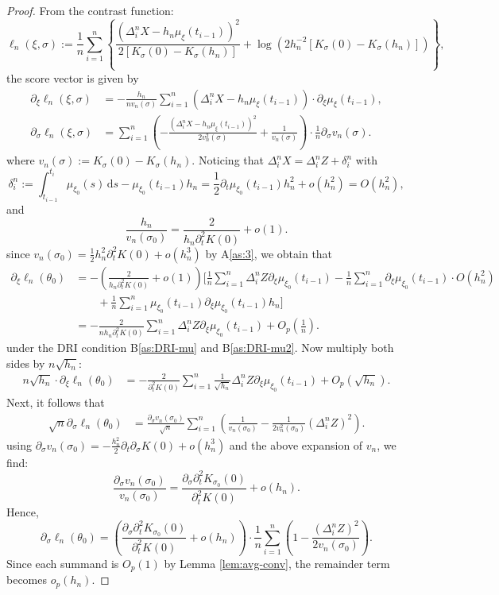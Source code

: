 \documentclass[a4paper,10pt,twoside]{article}
\numberwithin{equation}{section}
\def\D{\Delta}
\def\l{\left}
\def\r{\right}
\def\s{\sigma}
\def\p{\partial}
\begin{document}
\begin{proof}
From the contrast function:
\[
\ell_n(\xi, \sigma) := \frac{1}{n} \sum_{i=1}^n \l\{
\frac{(\Delta_i^n X - h_n \mu_\xi(t_{i-1}))^2}{2 [K_\sigma(0) - K_\sigma(h_n)]} +
\log \l( 2 h_n^{-2} [K_\sigma(0) - K_\sigma(h_n)] \r)
\r\}, 
\]
the score vector is given by
\begin{align*}
\partial_\xi \ell_n(\xi, \sigma)
&= - \frac{h_n}{n v_n(\s) } \sum_{i=1}^n (\Delta_i^n X - h_n \mu_\xi(t_{i-1})) \cdot \partial_\xi \mu_\xi(t_{i-1}), \\
\partial_\sigma \ell_n(\xi, \sigma)
&= \sum_{i=1}^n \l( -\frac{(\Delta_i^n X - h_n \mu_\xi(t_{i-1}))^2}{2 v_n^2(\s)} + \frac{1}{v_n(\s) } \r) \cdot \frac{1}{n} \partial_\sigma v_n(\s) .
\end{align*}
where $v_n(\s) := K_\sigma(0) - K_\sigma(h_n)$.
Noticing that $\D_i^n X = \D_i^n Z + \delta_i^n$ with
\[
\delta_i^n := \int_{t_{i-1}}^{t_i} \mu_{\xi_0}(s)\, \mathrm{d}s - \mu_{\xi_0}(t_{i-1}) h_n 
= \frac{1}{2} \p_t \mu_{\xi_0}(t_{i-1}) h_n^2 + o(h_n^2) = O(h_n^2), 
\]
and 
\[
\frac{h_n}{v_n(\sigma_0)} = \frac{2}{h_n \partial_t^2 K(0)} + o(1).
\]
since $v_n(\sigma_0) = \frac{1}{2} h_n^2 \partial_t^2 K(0) + o(h_n^3)$ by A\ref{as:3}, we obtain that 
\begin{align*}
\p_\xi \ell_n(\theta_0)
&= -\l(\frac{2}{h_n \p_t^2K(0)} + o(1)\r)\Bigg[\frac{1}{n}\sum_{i=1}^n \D_i^nZ \p_\xi\mu_{\xi_0}(t_{i-1}) - \frac{1}{n}\sum_{i=1}^n\p_\xi\mu_{\xi_0}(t_{i-1}) \cdot O(h_n^2) \\
&\qquad + \frac{1}{n}\sum_{i=1}^n \mu_{\xi_0}(t_{i-1}) \p_\xi\mu_{\xi_0}(t_{i-1})h_n \Bigg] \\
&= -\frac{2}{nh_n \p_t^2K(0)} \sum_{i=1}^n \D_i^nZ \p_\xi\mu_{\xi_0}(t_{i-1}) + O_p\l(\frac{1}{n}\r). 
\end{align*}
 under the DRI condition B\ref{as:DRI-mu} and B\ref{as:DRI-mu2}.
Now multiply both sides by $n \sqrt{h_n} $:
\begin{align*}
n \sqrt{h_n} \cdot \p_\xi \ell_n(\theta_0)
&= -\frac{2}{\p_t^2K(0)} \sum_{i=1}^n \frac{1}{\sqrt{h_n}}\D_i^nZ \p_\xi\mu_{\xi_0}(t_{i-1}) + O_p\l(\sqrt{h_n}\r).
\end{align*}
Next, it follows that 
\begin{align*}
\sqrt{n}  \partial_\sigma \ell_n(\theta_0) &= \frac{\partial_\sigma v_n(\s_0)}{\sqrt{n} } \sum_{i=1}^n \l( \frac{1}{v_n(\s_0)} - \frac{1}{2 v^2_n(\s_0)} (\Delta_i^n Z)^2 \r).
\end{align*}
using $\partial_\sigma v_n(\sigma_0) = - \frac{h_n^2}{2} \partial_t \partial_\sigma K(0) + o(h_n^3)$ and the above expansion of $v_n$, we find:
\[
\frac{\partial_\sigma v_n(\sigma_0)}{v_n(\sigma_0)} = \frac{\partial_\sigma \partial_t^2 K_{\s_0}(0)}{\partial_t^2 K(0)} + o(h_n).
\]
Hence,
\[
\partial_\sigma \ell_n(\theta_0) = \l( \frac{\partial_\sigma \partial_t^2K_{\s_0}(0)}{\partial_t^2 K(0)} + o(h_n) \r) \cdot \frac{1}{n} \sum_{i=1}^n \l(1 - \frac{(\Delta_i^n Z)^2}{2 v_n(\sigma_0)}\r).
\]
Since each summand is $O_p(1)$ by Lemma \ref{lem:avg-conv}, the remainder term becomes $o_p(h_n)$. 


\end{proof}
\end{document}
